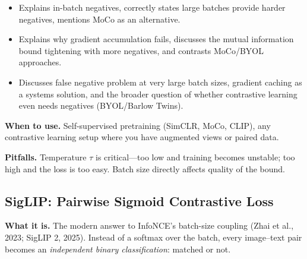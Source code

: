 \begin{interviewq}

\goodgreat
\begin{itemize}
    \item {} Explains in-batch negatives, correctly states large batches provide harder negatives, mentions MoCo as an alternative.
    \item {} Explains why gradient accumulation fails, discusses the mutual information bound tightening with more negatives, and contrasts MoCo/BYOL approaches.
    \item {} Discusses false negative problem at very large batch sizes, gradient caching as a systems solution, and the broader question of whether contrastive learning even needs negatives (BYOL/Barlow Twins).
\end{itemize}

\end{interviewq}

\textbf{When to use.} Self-supervised pretraining (SimCLR, MoCo, CLIP), any contrastive learning setup where you have augmented views or paired data.

\textbf{Pitfalls.} Temperature $\tau$ is critical---too low and training becomes unstable; too high and the loss is too easy. Batch size directly affects quality of the bound.

\subsection{SigLIP: Pairwise Sigmoid Contrastive Loss}

\textbf{What it is.} The modern answer to InfoNCE's batch-size coupling (Zhai et al., 2023; SigLIP 2, 2025). Instead of a softmax over the batch, every image--text pair becomes an \textit{independent binary classification}: matched or not.

